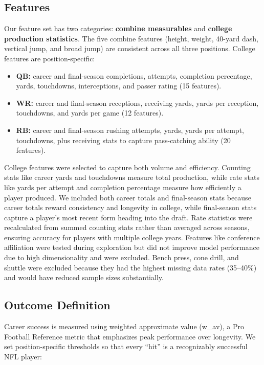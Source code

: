 \documentclass[10pt,twocolumn]{article}
\begin{document}
\subsection{Features}

Our feature set has two categories: \textbf{combine measurables} and \textbf{college production statistics}. The five combine features (height, weight, 40-yard dash, vertical jump, and broad jump) are consistent across all three positions. College features are position-specific:

\begin{itemize}
\setlength\itemsep{0pt}
\item \textbf{QB:} career and final-season completions, attempts, completion percentage, yards, touchdowns, interceptions, and passer rating (15 features).
\item \textbf{WR:} career and final-season receptions, receiving yards, yards per reception, touchdowns, and yards per game (12 features).
\item \textbf{RB:} career and final-season rushing attempts, yards, yards per attempt, touchdowns, plus receiving stats to capture pass-catching ability (20 features).
\end{itemize}

College features were selected to capture both volume and efficiency. Counting stats like career yards and touchdowns measure total production, while rate stats like yards per attempt and completion percentage measure how efficiently a player produced. We included both career totals and final-season stats because career totals reward consistency and longevity in college, while final-season stats capture a player's most recent form heading into the draft. Rate statistics were recalculated from summed counting stats rather than averaged across seasons, ensuring accuracy for players with multiple college years. Features like conference affiliation were tested during exploration but did not improve model performance due to high dimensionality and were excluded. Bench press, cone drill, and shuttle were excluded because they had the highest missing data rates (35--40\%) and would have reduced sample sizes substantially.

\subsection{Outcome Definition}

Career success is measured using weighted approximate value (w\_av), a Pro Football Reference metric that emphasizes peak performance over longevity. We set position-specific thresholds so that every ``hit'' is a recognizably successful NFL player:
\end{document}
